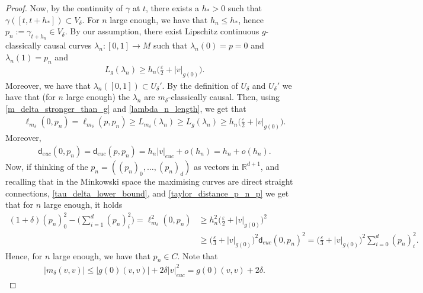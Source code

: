 \documentclass[a4paper,10pt]{article}
\numberwithin{equation}{section}
\newcommand{\R}{\mathbb{R}}
\newcommand{\e}{\varepsilon}
\newcommand{\sfd}{\mathsf d}
\begin{document}
\begin{proof}
   Now, by the continuity of $\gamma$ at $t$, there exists a $h_*>0$ such that $\gamma([t, t+h_*]) \subset V_\delta$. 
   For $n$ large enough, we have that $h_n \leq h_*$, hence $p_n:= \gamma_{t+h_n} \in V_\delta$. By our assumption, there exist Lipschitz continuous $g$-classically causal curves $\lambda_n\colon [0, 1] \to M$ such that $\lambda_n(0)=p=0$ and $\lambda_n(1)= p_n$ and 
   \begin{align}\label{lambda_n_length}
       L_g(\lambda_n) \geq h_n\Big(\frac{\e}{2} + |v|_{g(0)}\Big).
   \end{align}
   Moreover, we have that $\lambda_n([0,1]) \subset U_\delta'$. %
   By the definition of $U_\delta$ and $U_\delta'$ we have that (for $n$ large enough) the $\lambda_n$ are $m_{\delta}$-classically causal. Then, using \eqref{m_delta_stronger_than_g} and \eqref{lambda_n_length}, we get that
   \begin{align}\label{tau_delta_lower_bound}
      \ell_{m_\delta}(0, p_n) =\ell_{m_\delta}(p, p_n) \geq L_{m_\delta}(\lambda_n) \geq L_g(\lambda_n) \geq h_n\Big(\frac{\e}{2} + |v|_{g(0)}\Big).
   \end{align}
   Moreover, 
   \begin{align}\label{taylor_distance_p_n_p}
       \sfd_{euc}(0, p_n) =\sfd_{euc}(p, p_n) = h_n|v|_{euc} + o(h_n)= h_n + o(h_n).
   \end{align}
   Now, if thinking of the $p_n = ((p_n)_0, \ldots, (p_n)_d)$ as vectors in $\R^{d+1}$, and recalling that in the Minkowski space the maximising curves are direct straight connections, \eqref{tau_delta_lower_bound}, and \eqref{taylor_distance_p_n_p} we get that for $n$ large enough, it holds
   \begin{align}\label{p_n_is_in_C}
       (1+\delta)(p_n)_0^2 -\Big(\sum_{i=1}^d (p_n)_i^2\Big) = \ell^2_{m_\delta}(0, p_n) &\geq h^2_n\Big(\frac{\e}{2} + |v|_{g(0)}\Big)^2 \nonumber \\
       &\geq \Big(\frac{\e}{3} + |v|_{g(0)}\Big)^2 \sfd_{euc}(0, p_n)^2 = \Big(\frac{\e}{3} + |v|_{g(0)}\Big)^2\sum_{i=0}^d (p_n)_i^2.
   \end{align}
Hence, for $n$ large enough, we have that $p_n \in C$.
Note that
\begin{align}\label{m_delta_of_v_vs_g_v}
    |m_{\delta}(v,v)| \leq |g(0)(v,v)| + 2\delta|v|_{euc}^2 = g(0)(v,v) + 2\delta.
\end{align}

\end{proof}
\end{document}
